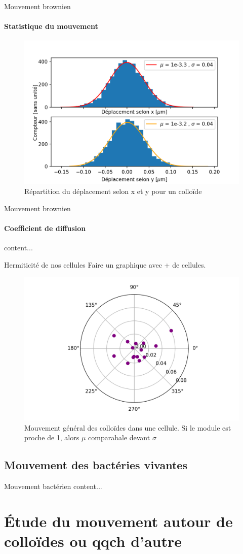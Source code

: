 \documentclass[11pt]{beamer}
\begin{document}
\begin{frame}{Mouvement brownien}
\framesubtitle{Statistique du mouvement}
\begin{figure}
	\centering
	\includegraphics[width=0.9\linewidth]{StatDepl_brownian}
	\caption{Répartition du déplacement selon x et y pour un colloïde}
	\label{fig:statdeplbrownian}
\end{figure}

\end{frame}


\begin{frame}{Mouvement brownien}
\framesubtitle{Coefficient de diffusion}
	content...
\end{frame}

\begin{frame}{Hermiticité de nos cellules}
Faire un graphique avec + de cellules.
\begin{figure}
	\centering
	\includegraphics[width=0.8\linewidth]{FuitesNico_1}
	\caption{Mouvement général des colloïdes dans une cellule. Si le module est proche de 1, alors $\mu$ comparabale devant $\sigma$}
	\label{fig:fuitesnico1}
\end{figure}

\end{frame}

\subsection{Mouvement des bactéries vivantes}
\begin{frame}{Mouvement bactérien}
	content...
\end{frame}

\section{Étude du mouvement autour de colloïdes ou qqch d'autre}
\end{document}
